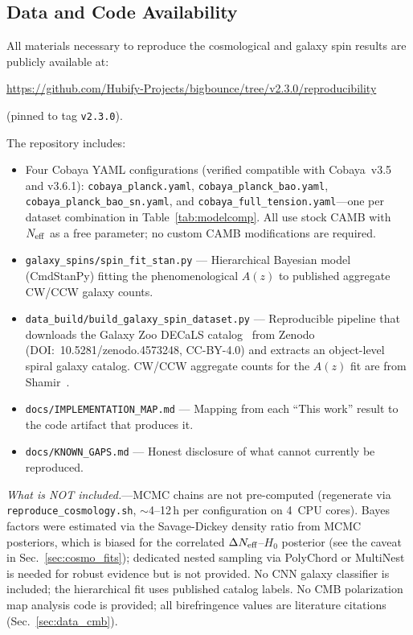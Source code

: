 \documentclass[aps,prd,twocolumn,superscriptaddress,showpacs,preprintnumbers,nofootinbib,longbibliography,floatfix]{revtex4-2}
\newcommand{\Neff}{N_{\rm eff}}
\begin{document}
\subsection*{Data and Code Availability}

All materials necessary to reproduce the cosmological and galaxy spin results are publicly available at:
\begin{center}
\url{https://github.com/Hubify-Projects/bigbounce/tree/v2.3.0/reproducibility}
\end{center}
\noindent (pinned to tag \texttt{v2.3.0}).

\noindent The repository includes:
\begin{itemize}[leftmargin=*]
\item Four Cobaya YAML configurations (verified compatible with Cobaya~v3.5 and v3.6.1): \texttt{cobaya\_planck.yaml}, \texttt{cobaya\_planck\_bao.yaml}, \texttt{cobaya\_planck\_bao\_sn.yaml}, and \texttt{cobaya\_full\_tension.yaml}---one per dataset combination in Table~\ref{tab:modelcomp}. All use stock CAMB with $\Neff$ as a free parameter; no custom CAMB modifications are required.
\item \texttt{galaxy\_spins/spin\_fit\_stan.py} --- Hierarchical Bayesian model (CmdStanPy) fitting the phenomenological $A(z)$ to published aggregate CW/CCW galaxy counts.
\item \texttt{data\_build/build\_galaxy\_spin\_dataset.py} --- Reproducible pipeline that downloads the Galaxy Zoo DECaLS catalog~\cite{Walmsley2022} from Zenodo (DOI:~10.5281/zenodo.4573248, CC-BY-4.0) and extracts an object-level spiral galaxy catalog. CW/CCW aggregate counts for the $A(z)$ fit are from Shamir~\cite{Shamir2024}.
\item \texttt{docs/IMPLEMENTATION\_MAP.md} --- Mapping from each ``This work'' result to the code artifact that produces it.
\item \texttt{docs/KNOWN\_GAPS.md} --- Honest disclosure of what cannot currently be reproduced.
\end{itemize}

\noindent \textit{What is NOT included.}---MCMC chains are not pre-computed (regenerate via \texttt{reproduce\_cosmology.sh}, $\sim$4--12\,h per configuration on 4~CPU cores). Bayes factors were estimated via the Savage-Dickey density ratio from MCMC posteriors, which is biased for the correlated $\Delta\Neff$--$H_0$ posterior (see the caveat in Sec.~\ref{sec:cosmo_fits}); dedicated nested sampling via PolyChord or MultiNest is needed for robust evidence but is not provided. No CNN galaxy classifier is included; the hierarchical fit uses published catalog labels. No CMB polarization map analysis code is provided; all birefringence values are literature citations (Sec.~\ref{sec:data_cmb}).
\end{document}
